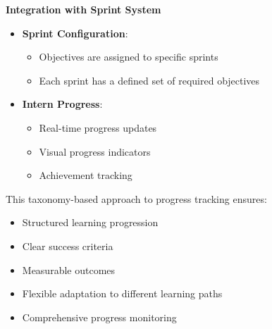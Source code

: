 \textbf{Integration with Sprint System}
\begin{itemize}
    \item \textbf{Sprint Configuration}:
    \begin{itemize}
        \item Objectives are assigned to specific sprints
        \item Each sprint has a defined set of required objectives
    \end{itemize}
    
    \item \textbf{Intern Progress}:
    \begin{itemize}
        \item Real-time progress updates
        \item Visual progress indicators
        \item Achievement tracking
    \end{itemize}
\end{itemize}

This taxonomy-based approach to progress tracking ensures:
\begin{itemize}
    \item Structured learning progression
    \item Clear success criteria
    \item Measurable outcomes
    \item Flexible adaptation to different learning paths
    \item Comprehensive progress monitoring
\end{itemize}




